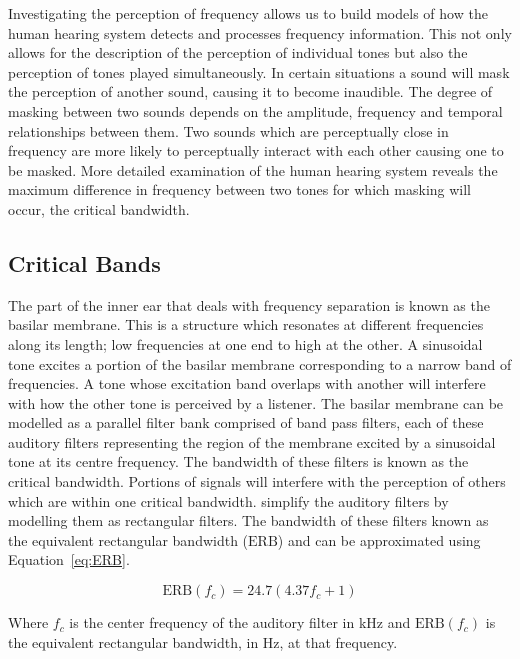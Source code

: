 		Investigating the perception of frequency allows us to build models of how the human hearing system detects
		and processes frequency information. This not only allows for the description of the perception of
		individual tones but also the perception of tones played simultaneously. In certain situations a sound will
		mask the perception of another sound, causing it to become inaudible. The degree of masking between two
		sounds depends on the amplitude, frequency and temporal relationships between them. Two sounds which are
		perceptually close in frequency are more likely to perceptually interact with each other causing one to be
		masked. More detailed examination of the human hearing system reveals the maximum difference in frequency
		between two tones for which masking will occur, the critical bandwidth.

	\subsection{Critical Bands}
	\label{sec:Timbre-PsychoacousticPrinciples-CriticalBands}
		The part of the inner ear that deals with frequency separation is known as the basilar membrane. This is a
		structure which resonates at different frequencies along its length; low frequencies at one end to high at
		the other. A sinusoidal tone excites a portion of the basilar membrane corresponding to a narrow band of
		frequencies. A tone whose excitation band overlaps with another will interfere with how the other tone is
		perceived by a listener. The basilar membrane can be modelled as a parallel filter bank comprised of band
		pass filters, each of these auditory filters representing the region of the membrane excited by a
		sinusoidal tone at its centre frequency. The bandwidth of these filters is known as the critical bandwidth.
		Portions of signals will interfere with the perception of others which are within one critical bandwidth.
		\citet{glasberg1990derivation} simplify the auditory filters by modelling them as rectangular filters. The
		bandwidth of these filters known as the equivalent rectangular bandwidth ($\mathrm{ERB}$) and can be
		approximated using Equation~\ref{eq:ERB}.

		\begin{equation}
			\mathrm{ERB}(f_{c}) = 24.7(4.37f_{c} + 1)
			\label{eq:ERB}
		\end{equation}

		Where $f_{c}$ is the center frequency of the auditory filter in kHz and $\mathrm{ERB}(f_{c})$ is the
		equivalent rectangular bandwidth, in Hz, at that frequency.

